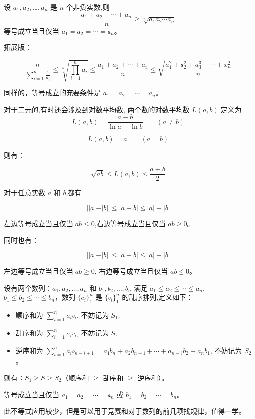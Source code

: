 \documentclass[lang=cn,10pt,twoside]{elegantbook}
\begin{document}
\begin{theorem}[平均值不等式]
  设 $a_1, a_2, \dots, a_n$ 是 $n$ 个非负实数,则
  \begin{equation*}
    \frac{a_1+a_2+\cdots+a_n}n \geq \sqrt[n]{a_1a_2 \cdots a_n}
  \end{equation*}
  等号成立当且仅当 $a_1 = a_2 = \cdots = a_n$。

  拓展版：

  $$\frac{n}{\sum _{i=1}^n \frac{1}{a_i}} \leq \sqrt[n]{\prod_{i=1}^n a_i} \leq \frac{a_1 + a_2 + \cdots + a_n}{n} \leq \sqrt{\frac{a_1^2 + a_2^2 + a_3^3 + \cdots + x_n^2}{n}}$$

  同样的，等号成立的充要条件是 $a_1 = a_2 = \cdots = a_n$。

  对于二元的,有时还会涉及到对数平均数, 两个数的对数平均数 $L(a,b)$ 定义为
  \begin{equation*}
    L(a,b) = \frac{a-b}{\ln a-\ln b} \qquad (a \neq b)
  \end{equation*}

  \begin{equation*}
    L(a,b) = a \qquad (a = b)
  \end{equation*}

  则有：

  \begin{equation*}
    \sqrt{ab} \leq L(a,b) \leq \frac{a+b}2
  \end{equation*}
\end{theorem}
\begin{theorem}[三角不等式]
  对于任意实数 $a$ 和 $b$,都有
  
  $$||a| - |b|| \leq |a+b| \leq |a| + |b|$$

  左边等号成立当且仅当 $ab \leq 0 $,右边等号成立当且仅当 $ab \geq 0$。
  
  同时也有：

  $$||a|-|b|| \leq |a-b| \leq |a| + |b|$$

  左边等号成立当且仅当 $ab \geq 0$, 右边等号成立当且仅当 $ab \leq 0$。
\end{theorem}
\newpage
\begin{theorem}[排序不等式]
  设有两个数列：$a_1, a_2, \dots, a_n$ 和 $b_1, b_2, \dots, b_n$ 满足 $a_1 \leq a_2 \leq \cdots \leq a_n$, $b_1 \leq b_2 \leq \cdots \leq b_n$，数列 $\{c_i\}_1^n$ 是 $\{b_i\}_1^n$ 的乱序排列,定义如下：
  
  \begin{itemize}
    \item 顺序和为 $\sum\limits_{i=1}^{n} {a_ib_i}$, 不妨记为 $S_1$;
    \item 乱序和为 $\sum\limits_{i=1}^{n} {a_ic_i}$, 不妨记为 $S$;
    \item 逆序和为 $\sum\limits_{i=1}^{n} {a_ib_{n-i+1}} = a_1b_n + a_2b_{n-1} + \cdots + a_{n-1}b_2 + a_nb_1$, 不妨记为 $S_2$。
  \end{itemize}

  则有：$S_1 \geq S \geq S_2$（顺序和 $\geq$ 乱序和 $\geq$ 逆序和）。

  等号成立当且仅当 $a_1 = a_2 = \cdots = a_n$ 或 $b_1=b_2=\cdots=b_n$。

  此不等式应用较少，但是可以用于竞赛和对于数列的前几项找规律，值得一学。
\end{theorem}
\end{document}
